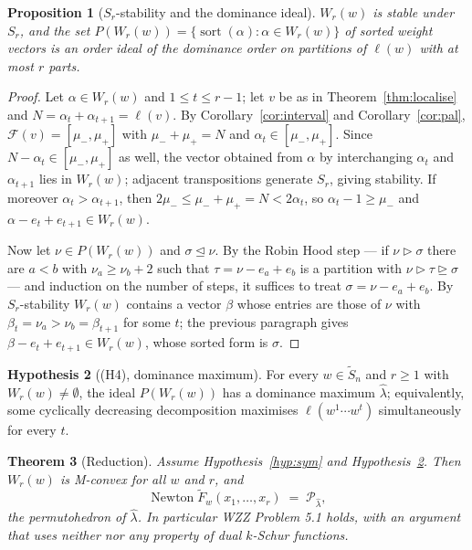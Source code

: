 \documentclass[11pt]{article}
\newtheorem{thm}{Theorem}[section]
\newtheorem{prop}[thm]{Proposition}
\theoremstyle{definition}
\newtheorem{hyp}[thm]{Hypothesis}
\newcommand{\Saff}{\widetilde{S}_{n}}
\newcommand{\Fw}{\widetilde{F}_{w}}
\newcommand{\sort}{\operatorname{sort}}
\begin{document}
\begin{prop}[$S_r$-stability and the dominance ideal]\label{prop:ideal}
$W_r(w)$ is stable under $S_r$, and the set
$P(W_r(w))=\{\sort(\alpha):\alpha\in W_r(w)\}$ of sorted weight vectors is an order ideal of the
dominance order on partitions of $\ell(w)$ with at most $r$ parts.
\end{prop}

\begin{proof}
Let $\alpha\in W_r(w)$ and $1\le t\le r-1$; let $v$ be as in Theorem~\ref{thm:localise} and
$N=\alpha_t+\alpha_{t+1}=\ell(v)$. By Corollary~\ref{cor:interval} and Corollary~\ref{cor:pal},
$\mathcal F(v)=[\mu_-,\mu_+]$ with $\mu_-+\mu_+=N$ and $\alpha_t\in[\mu_-,\mu_+]$. Since
$N-\alpha_t\in[\mu_-,\mu_+]$ as well, the vector obtained from $\alpha$ by interchanging
$\alpha_t$ and $\alpha_{t+1}$ lies in $W_r(w)$; adjacent transpositions generate $S_r$, giving
stability. If moreover $\alpha_t>\alpha_{t+1}$, then $2\mu_-\le\mu_-+\mu_+=N<2\alpha_t$, so
$\alpha_t-1\ge\mu_-$ and $\alpha-e_t+e_{t+1}\in W_r(w)$.

Now let $\nu\in P(W_r(w))$ and $\sigma\trianglelefteq\nu$. By the Robin Hood step
\cite[Lem.~4.1]{Clio2026} --- if $\nu\rhd\sigma$ there are $a<b$ with $\nu_a\ge\nu_b+2$ such
that $\tau=\nu-e_a+e_b$ is a partition with $\nu\rhd\tau\trianglerighteq\sigma$ --- and
induction on the number of steps, it suffices to treat $\sigma=\nu-e_a+e_b$. By $S_r$-stability
$W_r(w)$ contains a vector $\beta$ whose entries are those of $\nu$ with
$\beta_t=\nu_a>\nu_b=\beta_{t+1}$ for some $t$; the previous paragraph gives
$\beta-e_t+e_{t+1}\in W_r(w)$, whose sorted form is $\sigma$.
\end{proof}

\begin{hyp}[(H4), dominance maximum]\label{hyp:h4}
For every $w\in\Saff$ and $r\ge1$ with $W_r(w)\ne\emptyset$, the ideal $P(W_r(w))$ has a
dominance maximum $\widehat\lambda$; equivalently, some cyclically decreasing decomposition
maximises $\ell(w^1\cdots w^t)$ simultaneously for every $t$.
\end{hyp}

\begin{thm}[Reduction]\label{thm:reduction}
Assume Hypothesis~\ref{hyp:sym} and Hypothesis~\ref{hyp:h4}. Then $W_r(w)$ is M-convex for all
$w$ and $r$, and
\[
  \operatorname{Newton}\Fw(x_1,\dots,x_r)\;=\;\mathcal P_{\widehat\lambda},
\]
the permutohedron of $\widehat\lambda$. In particular WZZ Problem 5.1 holds, with an argument
that uses neither \cite[Cor.~8.5]{Lam2008} nor any property of dual $k$-Schur functions.
\end{thm}
\end{document}
